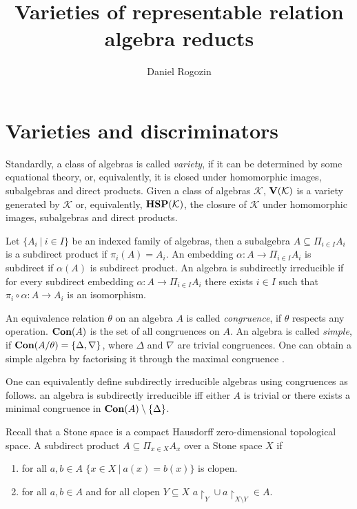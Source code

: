 \documentclass[a4paper]{article}
\author{Daniel Rogozin}
\date{}
\title{Varieties of representable relation algebra reducts}
\theoremstyle{defin}
\theoremstyle{theorem}
\theoremstyle{claim}
\theoremstyle{prop}
\theoremstyle{lemma}
\theoremstyle{fact}
\theoremstyle{ex}
\theoremstyle{col}
\begin{document}
\maketitle

\nocite{*}

\section{Varieties and discriminators}

Standardly, a class of algebras is called \emph{variety}, if it can be determined by some equational theory, or, equivalently, it is closed under homomorphic images, subalgebras and direct products. Given a class of algebras $\mathcal{K}$, ${\bf V}(\mathcal{K})$ is a variety generated by $\mathcal{K}$ or, equivalently, ${\bf HSP}(\mathcal{K})$, the closure of $\mathcal{K}$ under homomorphic images, subalgebras and direct products.

Let $\{ A_i \: | \: i \in I \}$ be an indexed family of algebras, then a subalgebra $A \subseteq \Pi_{i \in I} A_i$ is a subdirect product if $\pi_i(A) = A_i$. An embedding $\alpha : A \to \Pi_{i \in I} A_i$ is subdirect if $\alpha(A)$ is subdirect product. An algebra is subdirectly irreducible if for every subdirect embedding $\alpha : A \to \Pi_{i \in I} A_i$ there exists $i \in I$ such that $\pi_i \circ \alpha : A \to A_i$ is an isomorphism.

An equivalence relation $\theta$ on an algebra $A$ is called \emph{congruence}, if $\theta$ respects any operation. ${\bf Con}(A)$ is the set of all congruences on $A$. An algebra is called \emph{simple}, if ${\bf Con}(A/\theta) = \{ \Delta, \nabla \}$, where $\Delta$ and $\nabla$ are trivial congruences. One can obtain a simple algebra by factorising it through the maximal congruence \cite[Theorem 8]{sankappanavar1981course}.

One can equivalently define subdirectly irreducible algebras using congruences as follows. an algebra is subdirectly irreducible iff either $A$ is trivial or there exists a minimal congruence in ${\bf Con}(A) \setminus \{ \Delta \}$.

Recall that a Stone space is a compact Hausdorff zero-dimensional topological space. A subdirect product $A \subseteq \Pi_{x \in X} A_x$ over a Stone space $X$ if
\begin{enumerate}
\item for all $a, b \in A$ $\{ x \in X \: | \: a(x) = b(x) \}$ is clopen.
\item for all $a, b \in A$ and for all clopen $Y \subseteq X$ $a \upharpoonright_{Y} \cup a \upharpoonright_{X \setminus Y} \in A$.
\end{enumerate}
\end{document}
